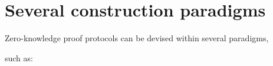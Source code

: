 
% 
% 
% 
% 
% 
% 
% 
% 


\section{Several construction paradigms}
\label{paradigms:others}


Zero-knowledge proof protocols can be devised within several paradigms,%

such as:


